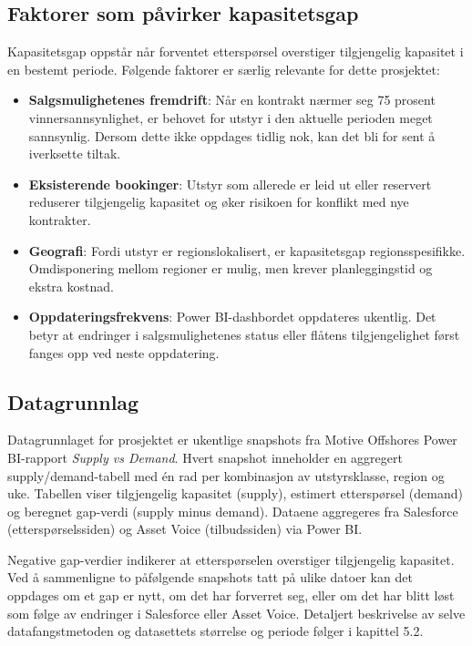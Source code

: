 \documentclass[a4paper,11pt]{article}
\begin{document}
\subsection{Faktorer som påvirker kapasitetsgap}

Kapasitetsgap oppstår når forventet etterspørsel overstiger tilgjengelig kapasitet i en bestemt periode. Følgende faktorer er særlig relevante for dette prosjektet:

\begin{itemize}
\item \textbf{Salgsmulighetenes fremdrift}: Når en kontrakt nærmer seg 75 prosent vinnersannsynlighet, er behovet for utstyr i den aktuelle perioden meget sannsynlig. Dersom dette ikke oppdages tidlig nok, kan det bli for sent å iverksette tiltak.
\item \textbf{Eksisterende bookinger}: Utstyr som allerede er leid ut eller reservert reduserer tilgjengelig kapasitet og øker risikoen for konflikt med nye kontrakter.
\item \textbf{Geografi}: Fordi utstyr er regionslokalisert, er kapasitetsgap regionsspesifikke. Omdisponering mellom regioner er mulig, men krever planleggingstid og ekstra kostnad.
\item \textbf{Oppdateringsfrekvens}: Power BI-dashbordet oppdateres ukentlig. Det betyr at endringer i salgsmulighetenes status eller flåtens tilgjengelighet først fanges opp ved neste oppdatering.
\end{itemize}

\subsection{Datagrunnlag}

Datagrunnlaget for prosjektet er ukentlige snapshots fra Motive Offshores Power BI-rapport \textit{Supply vs Demand}. Hvert snapshot inneholder en aggregert supply/demand-tabell med én rad per kombinasjon av utstyrsklasse, region og uke. Tabellen viser tilgjengelig kapasitet (supply), estimert etterspørsel (demand) og beregnet gap-verdi (supply minus demand). Dataene aggregeres fra Salesforce (etterspørselssiden) og Asset Voice (tilbudssiden) via Power BI.

Negative gap-verdier indikerer at etterspørselen overstiger tilgjengelig kapasitet. Ved å sammenligne to påfølgende snapshots tatt på ulike datoer kan det oppdages om et gap er nytt, om det har forverret seg, eller om det har blitt løst som følge av endringer i Salesforce eller Asset Voice. Detaljert beskrivelse av selve datafangstmetoden og datasettets størrelse og periode følger i kapittel 5.2.
\end{document}

